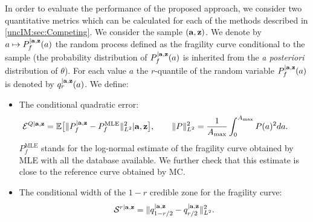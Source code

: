         In order to evaluate the performance of the proposed approach, we consider two quantitative metrics which can be calculated for each of the methods described in \cref{uncIM:sec:Competing}.
    We consider the sample $(\mathbf{a}, \mathbf{z}) $. We denote by $a \mapsto P_f^{|\mathbf{a},\mathbf{z}}(a)$ the random process defined as the fragility curve conditional to the sample (the probability distribution of $P_f^{|\mathbf{a},\mathbf{z}}(a)$ is inherited from the \emph{a posteriori} distribution of $\theta$). For each value $a$ the $r$-quantile of the random variable $P_f^{|\mathbf{a},\mathbf{z}}(a)$ is denoted by $q_r^{|\mathbf{a},\mathbf{z}}(a)$.  
    We define:
    \begin{itemize}
            \item The conditional quadratic error: %
                \begin{equation} \label{uncIM:eq:quaderror}
                \hspace*{-0.3in}
                    \cE^{Q|\mbf a,\mbf z} = \EE\big[\| P_{f}^{|\mbf a,\mbf z} - P_f^{\mathrm{MLE}} \|_{L^2}^2|\mbf a,\mbf z \big] ,\qquad \| P\|_{L^2}^2 = \frac{1}{A_{\rm max}} \int_{0}^{A_{\rm max}} P(a)^2 da .
                \end{equation}
       $P_f^{\mathrm{MLE}}$ stands for the log-normal estimate of the fragility curve obtained by MLE with all the database available. We further check that this estimate is close to the reference curve obtained by MC.             
            \item  The conditional width of the $1-r$ credible zone for the fragility curve:
                \begin{equation} \label{uncIM:eq:scaleerror}
                    \mathcal{S}^{r|\mathbf{a},\mathbf{z}} = \|q_{1-{r/2}}^{|\mathbf{a},\mathbf{z}} - q_{{r/2}}^{|\mathbf{a},\mathbf{z}}\|_{L^2}^2  .
                \end{equation}
        \end{itemize}

